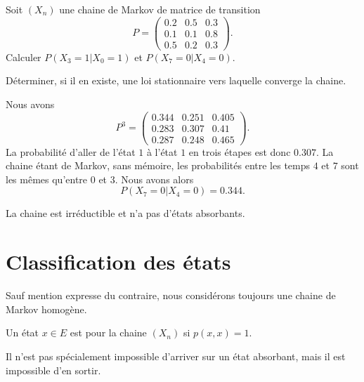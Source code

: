 \begin{example}

	Soit \( (X_n)\) une chaine de Markov de matrice de transition
	\begin{equation}
		P=\begin{pmatrix}
			0.2 & 0.5 & 0.3 \\
			0.1 & 0.1 & 0.8 \\
			0.5 & 0.2 & 0.3
		\end{pmatrix}.
	\end{equation}
	Calculer \( P(X_3=1|X_0=1)\) et \( P(X_7=0|X_4=0)\).

	Déterminer, si il en existe, une loi stationnaire vers laquelle converge la chaine.

	Nous avons
	\begin{equation}
		P^3=\begin{pmatrix}
			0.344 & 0.251 & 0.405 \\
			0.283 & 0.307 & 0.41  \\
			0.287 & 0.248 & 0.465
		\end{pmatrix}.
	\end{equation}
	La probabilité d'aller de l'état \( 1\) à l'état \( 1\) en trois étapes est donc \( 0.307\). La chaine étant de Markov, sans mémoire, les probabilités entre les temps \( 4\) et \( 7\) sont les mêmes qu'entre \( 0\) et \( 3\). Nous avons alors
	\begin{equation}
		P(X_7=0|X_4=0)=0.344.
	\end{equation}

	La chaine est irréductible et n'a pas d'états absorbants.



\end{example}

\section{Classification des états}

Sauf mention expresse du contraire, nous considérons toujours une chaine de Markov homogène.

\begin{definition}
	Un état \( x\in E\) est  pour la chaine \( (X_n)\) si \( p(x,x)=1\).
\end{definition}
Il n'est pas spécialement impossible d'arriver sur un état absorbant, mais il est impossible d'en sortir.

